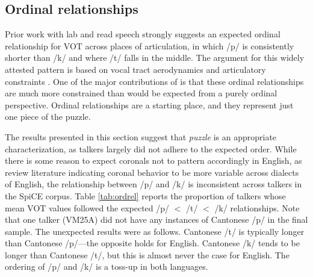 \subsection{Ordinal relationships}\label{ch4:sec:ordrel}

Prior work with lab and read speech strongly suggests an expected ordinal relationship for VOT across places of articulation, in which /p/ is consistently shorter than /k/ and where /t/ falls in the middle. The argument for this widely attested pattern is based on vocal tract aerodynamics and articulatory constraints \citep{cho_1999_vot}. One of the major contributions of \citet{chodroff_2017_structure} is that these ordinal relationships are much more constrained than would be expected from a purely ordinal perspective. Ordinal relationships are a starting place, and they represent just one piece of the puzzle. 

The results presented in this section suggest that \textit{puzzle} is an appropriate characterization, as talkers largely did not adhere to the expected order. While there is some reason to expect coronals not to pattern accordingly in English, as \citet{chodroff_2017_structure} review literature indicating coronal behavior to be more variable across dialects of English, the relationship between /p/ and /k/ is inconsistent across talkers in the SpiCE corpus. Table \ref{tab:ordrel} reports the proportion of talkers whose mean VOT values followed the expected /p/ $<$ /t/ $<$ /k/ relationships. Note that one talker (VM25A) did not have any instances of Cantonese /p/ in the final sample. The unexpected results were as follows. Cantonese /t/ is typically longer than Cantonese /p/---the opposite holds for English. Cantonese /k/ tends to be longer than Cantonese /t/, but this is almost never the case for English. The ordering of /p/ and /k/ is a toss-up in both languages. 

